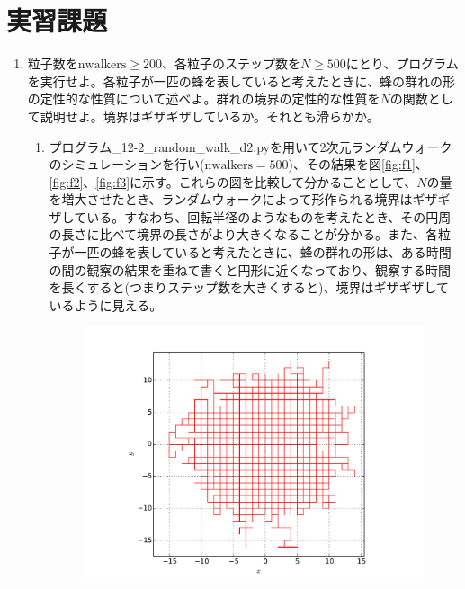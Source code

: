 \documentclass{jsarticle}
\begin{document}
    \section{実習課題}
    
        \begin{enumerate}
            \renewcommand{\labelenumi}{\alph{enumi}.}
            \renewcommand{\labelenumii}{}
            
            \item  粒子数を$\mathrm{nwalkers} \geq 200$、各粒子のステップ数を$N \geq 500$にとり、プログラムを実行せよ。各粒子が一匹の蜂を表していると考えたときに、蜂の群れの形の定性的な性質について述べよ。群れの境界の定性的な性質を$N$の関数として説明せよ。境界はギザギザしているか。それとも滑らかか。
                
                \begin{enumerate}
                    \item プログラム\_12-2\_random\_walk\_d2.pyを用いて2次元ランダムウォークのシミュレーションを行い($\mathrm{nwalkers}=500$)、その結果を図\ref{fig:f1}、\ref{fig:f2}、\ref{fig:f3}に示す。これらの図を比較して分かることとして、$N$の量を増大させたとき、ランダムウォークによって形作られる境界はギザギザしている。すなわち、回転半径のようなものを考えたとき、その円周の長さに比べて境界の長さがより大きくなることが分かる。また、各粒子が一匹の蜂を表していると考えたときに、蜂の群れの形は、ある時間の間の観察の結果を重ねて書くと円形に近くなっており、観察する時間を長くすると(つまりステップ数を大きくすると)、境界はギザギザしているように見える。
                    \begin{figure}[H]
                        \begin{center}
                            \includegraphics[width=12.5cm]{figure_3.pdf}

\end{center}
\end{figure}
\end{enumerate}
\end{enumerate}
\end{document}
